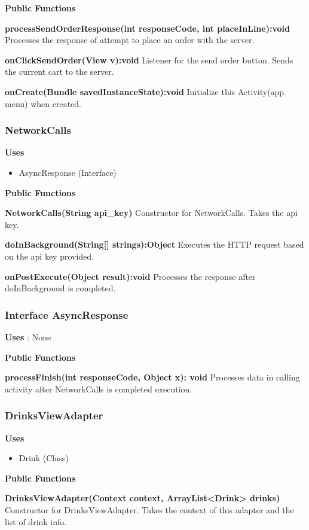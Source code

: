 \documentclass [10pt]{article}
\begin{document}
\textbf{Public Functions}

\textbf{processSendOrderResponse(int responseCode, int placeInLine):void}
Processes the response of attempt to place an order with the server.

\textbf{onClickSendOrder(View v):void}
Listener for the send order button. Sends the current cart to the server.

\textbf{onCreate(Bundle savedInstanceState):void}
Initialize this Activity(app menu) when created.

\subsubsection{NetworkCalls}
\textbf{Uses}
\begin{itemize}
	\item AsyncResponse (Interface)
\end{itemize}


\textbf{Public Functions}

\textbf{NetworkCalls(String api\_key)}
Constructor for NetworkCalls. Takes the api key.

\textbf{doInBackground(String[] strings):Object}
Executes the HTTP request based on the api key provided.

\textbf{onPostExecute(Object result):void}
Processes the response after doInBackground is completed.

\subsubsection{Interface AsyncResponse}
\textbf{Uses} : None

\textbf{Public Functions}

\textbf{processFinish(int responseCode, Object x): void}
Processes data in calling activity after NetworkCalls is completed execution.

\subsubsection{DrinksViewAdapter}

\textbf{Uses}
\begin{itemize}
	\item Drink (Class)
\end{itemize}

\textbf{Public Functions}

\textbf{DrinksViewAdapter(Context context, ArrayList<Drink> drinks)}
Constructor for DrinksViewAdapter. Takes the context of this adapter and the list of drink info.
\end{document}
